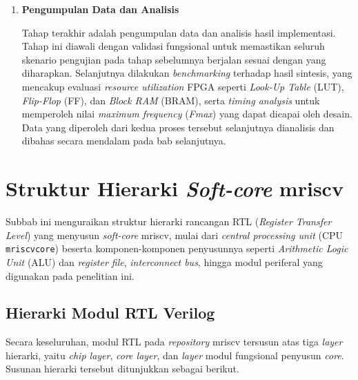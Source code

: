 \begin{enumerate}
	\item \textbf{Pengumpulan Data dan Analisis}

	Tahap terakhir adalah pengumpulan data dan analisis hasil implementasi. Tahap ini diawali dengan validasi fungsional untuk memastikan seluruh skenario pengujian pada tahap sebelumnya berjalan sesuai dengan yang diharapkan. Selanjutnya dilakukan \textit{benchmarking} terhadap hasil sintesis, yang mencakup evaluasi \textit{resource utilization} FPGA seperti \textit{Look-Up Table} (LUT), \textit{Flip-Flop} (FF), dan \textit{Block RAM} (BRAM), serta \textit{timing analysis} untuk memperoleh nilai \textit{maximum frequency} (\textit{Fmax}) yang dapat dicapai oleh desain. Data yang diperoleh dari kedua proses tersebut selanjutnya dianalisis dan dibahas secara mendalam pada bab selanjutnya.
\end{enumerate}

\pagebreak

\section{Struktur Hierarki \textit{Soft-core} mriscv}
\label{sec:struktur-hierarki}

Subbab ini menguraikan struktur hierarki rancangan RTL (\textit{Register Transfer Level}) yang menyusun \textit{soft-core} mriscv, mulai dari \textit{central processing unit} (CPU \texttt{mriscvcore}) beserta komponen-komponen penyusunnya seperti \textit{Arithmetic Logic Unit} (ALU) dan \textit{register file}, \textit{interconnect bus}, hingga modul periferal yang digunakan pada penelitian ini.


\subsection{Hierarki Modul RTL Verilog}
\label{subsec:hierarki-modul-rtl}

Secara keseluruhan, modul RTL pada \textit{repository} mriscv tersusun atas tiga \textit{layer} hierarki, yaitu \textit{chip layer}, \textit{core layer}, dan \textit{layer} modul fungsional penyusun \textit{core}. Susunan hierarki tersebut ditunjukkan sebagai berikut.


